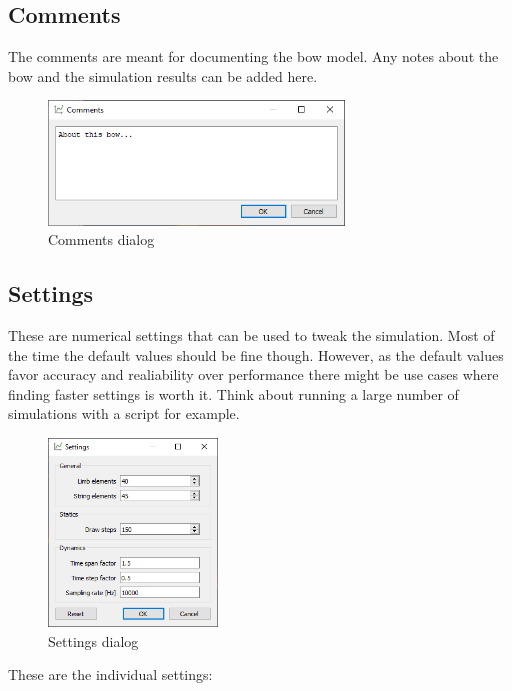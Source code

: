 \documentclass[12pt]{article}
\begin{document}
\newpage
\subsection{Comments}

The comments are meant for documenting the bow model. Any notes about the bow and the simulation results can be added here.

\begin{figure}[H]
\centering
\includegraphics[width=0.7\textwidth]{figures/screenshots/input/comments}
\caption{Comments dialog}
\label{fig:comments}
\end{figure}

\subsection{Settings}

These are numerical settings that can be used to tweak the simulation.
Most of the time the default values should be fine though.
However, as the default values favor accuracy and realiability over performance there might be use cases where finding faster settings is worth it.
Think about running a large number of simulations with a script for example.

\begin{figure}[H]
\centering
\includegraphics[width=0.4\textwidth]{figures/screenshots/input/settings}
\caption{Settings dialog}
\label{fig:settings}
\end{figure}

\newpage
These are the individual settings:
\end{document}
